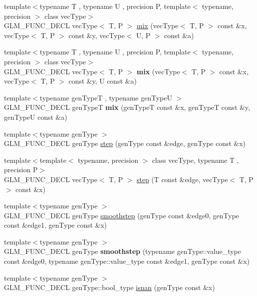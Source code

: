 \begin{DoxyCompactItemize}
\item 
{\footnotesize template$<$typename T , typename U , precision P, template$<$ typename, precision $>$ class vec\+Type$>$ }\\G\+L\+M\+\_\+\+F\+U\+N\+C\+\_\+\+D\+E\+CL vec\+Type$<$ T, P $>$ \hyperlink{group__core__func__common_gadccbaffe46f369cf1a96b2aef92cbfdd}{mix} (vec\+Type$<$ T, P $>$ const \&x, vec\+Type$<$ T, P $>$ const \&y, vec\+Type$<$ U, P $>$ const \&a)
\item 
{\footnotesize template$<$typename T , typename U , precision P, template$<$ typename, precision $>$ class vec\+Type$>$ }\\G\+L\+M\+\_\+\+F\+U\+N\+C\+\_\+\+D\+E\+CL vec\+Type$<$ T, P $>$ {\bfseries mix} (vec\+Type$<$ T, P $>$ const \&x, vec\+Type$<$ T, P $>$ const \&y, U const \&a)
\item 
{\footnotesize template$<$typename gen\+TypeT , typename gen\+TypeU $>$ }\\G\+L\+M\+\_\+\+F\+U\+N\+C\+\_\+\+D\+E\+CL gen\+TypeT {\bfseries mix} (gen\+TypeT const \&x, gen\+TypeT const \&y, gen\+TypeU const \&a)
\item 
{\footnotesize template$<$typename gen\+Type $>$ }\\G\+L\+M\+\_\+\+F\+U\+N\+C\+\_\+\+D\+E\+CL gen\+Type \hyperlink{group__core__func__common_gaf21c84759af7799f573865f70c2f0a86}{step} (gen\+Type const \&edge, gen\+Type const \&x)
\item 
{\footnotesize template$<$template$<$ typename, precision $>$ class vec\+Type, typename T , precision P$>$ }\\G\+L\+M\+\_\+\+F\+U\+N\+C\+\_\+\+D\+E\+CL vec\+Type$<$ T, P $>$ \hyperlink{group__core__func__common_gae830a682901c0ba63c92a7d201bba007}{step} (T const \&edge, vec\+Type$<$ T, P $>$ const \&x)
\item 
{\footnotesize template$<$typename gen\+Type $>$ }\\G\+L\+M\+\_\+\+F\+U\+N\+C\+\_\+\+D\+E\+CL gen\+Type \hyperlink{group__core__func__common_ga754103c8d2cdaf40f71429252457c10a}{smoothstep} (gen\+Type const \&edge0, gen\+Type const \&edge1, gen\+Type const \&x)
\item 
{\footnotesize template$<$typename gen\+Type $>$ }\\G\+L\+M\+\_\+\+F\+U\+N\+C\+\_\+\+D\+E\+CL gen\+Type {\bfseries smoothstep} (typename gen\+Type\+::value\+\_\+type const \&edge0, typename gen\+Type\+::value\+\_\+type const \&edge1, gen\+Type const \&x)
\item 
{\footnotesize template$<$typename gen\+Type $>$ }\\G\+L\+M\+\_\+\+F\+U\+N\+C\+\_\+\+D\+E\+CL gen\+Type\+::bool\+\_\+type \hyperlink{group__core__func__common_ga8a9dec5200888766fbcb51b6a5898728}{isnan} (gen\+Type const \&x)

\end{DoxyCompactItemize}
